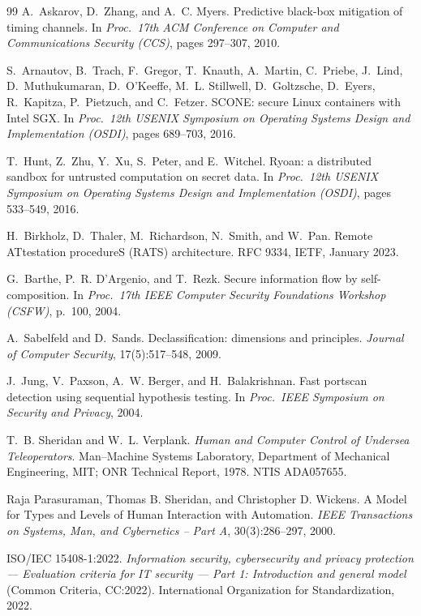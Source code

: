 \documentclass[11pt,a4paper]{article}
\theoremstyle{definition}
\begin{document}
\begin{thebibliography}{99}
 A.~Askarov, D.~Zhang, and A.~C. Myers. Predictive black-box mitigation of timing
channels. In \emph{Proc.\ 17th ACM Conference on Computer and Communications Security (CCS)},
pages 297--307, 2010.

 S.~Arnautov, B.~Trach, F.~Gregor, T.~Knauth, A.~Martin, C.~Priebe, J.~Lind,
D.~Muthukumaran, D.~O'Keeffe, M.~L. Stillwell, D.~Goltzsche, D.~Eyers, R.~Kapitza, P.~Pietzuch,
and C.~Fetzer. SCONE: secure Linux containers with Intel SGX. In \emph{Proc.\ 12th USENIX
Symposium on Operating Systems Design and Implementation (OSDI)}, pages 689--703, 2016.

 T.~Hunt, Z.~Zhu, Y.~Xu, S.~Peter, and E.~Witchel. Ryoan: a distributed sandbox for
untrusted computation on secret data. In \emph{Proc.\ 12th USENIX Symposium on Operating Systems
Design and Implementation (OSDI)}, pages 533--549, 2016.

 H.~Birkholz, D.~Thaler, M.~Richardson, N.~Smith, and W.~Pan. Remote ATtestation
procedureS (RATS) architecture. RFC 9334, IETF, January 2023.

 G.~Barthe, P.~R. D'Argenio, and T.~Rezk. Secure information flow by
self-composition. In \emph{Proc.\ 17th IEEE Computer Security Foundations Workshop (CSFW)},
p.~100, 2004.

 A.~Sabelfeld and D.~Sands. Declassification: dimensions and principles.
\emph{Journal of Computer Security}, 17(5):517--548, 2009.

 J.~Jung, V.~Paxson, A.~W. Berger, and H.~Balakrishnan. Fast portscan detection
using sequential hypothesis testing. In \emph{Proc.\ IEEE Symposium on Security and Privacy},
2004.

 T.~B. Sheridan and W.~L. Verplank. \emph{Human and Computer
Control of Undersea Teleoperators}. Man--Machine Systems Laboratory, Department of Mechanical
Engineering, MIT; ONR Technical Report, 1978. NTIS ADA057655.

 Raja Parasuraman, Thomas B. Sheridan, and Christopher D. Wickens.
\newblock A Model for Types and Levels of Human Interaction with Automation.
\newblock \textit{IEEE Transactions on Systems, Man, and Cybernetics -- Part A}, 30(3):286--297, 2000.

 ISO/IEC 15408-1:2022. \emph{Information security, cybersecurity and privacy
protection --- Evaluation criteria for IT security --- Part 1: Introduction and general model}
(Common Criteria, CC:2022). International Organization for Standardization, 2022.


\end{thebibliography}
\end{document}
